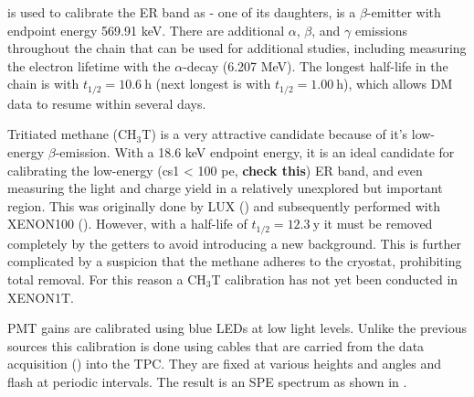 \radoncal is used to calibrate the ER band as  - one of its daughters, is a $\beta$-emitter with endpoint energy
569.91 keV.  There are additional $\alpha$, $\beta$, and $\gamma$ emissions throughout the chain that can be used for additional studies,
including measuring the electron lifetime with the  $\alpha$-decay (6.207 MeV).  The longest half-life in the chain is
 with $t_{1/2} = 10.6\ \mathrm{h}$ (next longest is  with $t_{1/2} = 1.00\ \mathrm{h}$), which allows DM data
to resume within several days.

Tritiated methane (CH$_{3}$T) is a very attractive candidate because of it's low-energy $\beta$-emission.  With a 18.6 keV endpoint energy,
it is an ideal candidate for calibrating the low-energy (cs1 < 100 pe, \textbf{check this}) ER band, and even measuring the light and
charge yield in a relatively unexplored but important
region.  This was originally done by LUX () and subsequently performed with XENON100 ().  However,
with a half-life of $t_{1/2} = 12.3\ \mathrm{y}$ it must be removed completely by the getters to avoid introducing a new background.  This
is further complicated by a suspicion that the methane adheres to the cryostat, prohibiting total removal.  For this reason a CH$_3$T
calibration has not yet been conducted in XENON1T.

PMT gains are calibrated using blue LEDs at low light levels.  Unlike the previous sources this calibration is done using cables that are
carried from the data acquisition () into the TPC.  They are fixed at various heights and angles and flash
at periodic intervals.  The result is an SPE spectrum as shown in .

